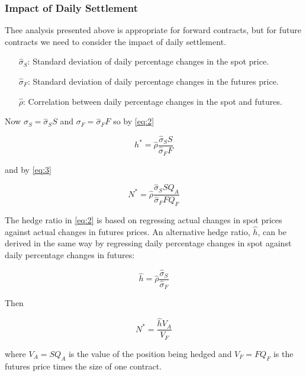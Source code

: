 \subsubsection*{Impact of Daily Settlement}

Thee analysis presented above is appropriate for forward contracts, but for future contracts we need to consider the impact of daily settlement.

\begin{definition}
    \hphantom{Define:}
    \begin{enumerate}
        \item[\(\hat{\sigma}_{S}\):] Standard deviation of daily percentage changes in the spot price.
        \item[\(\hat{\sigma}_{F}\):] Standard deviation of daily percentage changes in the futures price.
        \item[\(\hat{\rho}\):] Correlation between daily percentage changes in the spot and futures.
    \end{enumerate}
\end{definition}

Now \(\sigma_{S}=\hat{\sigma}_{S}S\) and \(\sigma_{F}=\hat{\sigma}_{F}F\) so by \eqref{eq:2}

\begin{equation*}
    h^{*}=\hat{\rho}\frac{\hat{\sigma}_{S}S}{\hat{\sigma}_{F}F}
\end{equation*}

and by \eqref{eq:3}

\begin{equation*}
    N^{*}=\hat{\rho}\frac{\hat{\sigma}_{S}SQ_{A}}{\hat{\sigma}_{F}FQ_{F}}
\end{equation*}

The hedge ratio in \eqref{eq:2} is based on regressing actual changes in spot prices against actual changes in futures prices. An alternative hedge ratio, \(\hat{h}\), can be derived in the same way by regressing daily percentage changes in spot against daily percentage changes in futures:

\begin{equation*}
    \hat{h}=\hat{\rho}\frac{\hat{\sigma}_S}{\hat{\sigma}_F}
\end{equation*}

Then

\begin{equation}
    N^{*}=\frac{\hat{h}V_{A}}{V_{F}}
\end{equation}

where \(V_{A}=SQ_{A}\) is the value of the position being hedged and \(V_{F}=FQ_{F}\) is the futures price times the size of one contract.

